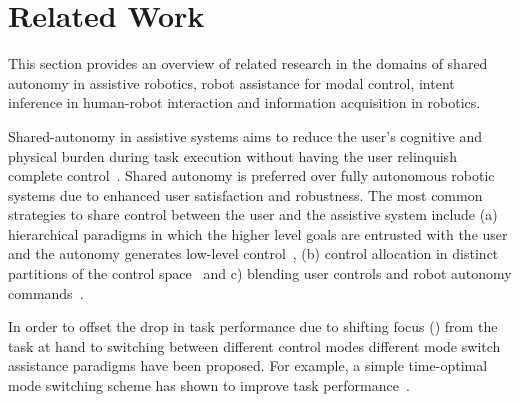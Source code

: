 %


\section{Related Work}\label{sec:related-work}
This section provides an overview of related research in the domains of shared autonomy in assistive robotics, robot assistance for modal control, intent inference in human-robot interaction and information acquisition in robotics. 

Shared-autonomy in assistive systems aims to reduce the user's cognitive and physical burden during task execution without having the user relinquish complete control~\citep{philips2007adaptive,demeester2008user, gopinath2017human, muelling2017autonomy}. Shared autonomy is preferred over fully autonomous robotic systems due to enhanced user satisfaction and robustness. The most common strategies to share control between the user and the assistive system include (a) hierarchical paradigms in which the higher level goals are entrusted with the user and the autonomy generates low-level control~\citep{tsui2011want, kim2010relationship, kim2012autonomy}, (b) control allocation in distinct partitions of the control space~\citep{driessen2005collaborative} and c) blending user controls and robot autonomy commands~\citep{downey2016blending, storms2014blending, muelling2017autonomy}. 

In order to offset the drop in task performance due to shifting focus () from the task at hand to switching between different control modes different mode switch assistance paradigms have been proposed. For example, a simple time-optimal mode switching scheme has shown to improve task performance~\citep{herlant2016assistive, pilarski2012dynamic}. 

